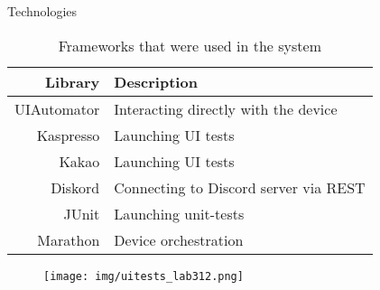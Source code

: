 \documentclass{beamer}%
\begin{document}
\begin{frame}{Technologies}
\begin{changemargin}
\footnotesize


\begin{table}[h]
\caption{Frameworks that were used in the system}
\centering\begin{tabular}{rl}
\toprule
Library     & Description                           \\
\midrule
UIAutomator & Interacting directly with the device  \\
Kaspresso   & Launching UI tests                    \\
Kakao       & Launching UI tests                    \\
Diskord     & Connecting to Discord server via REST \\
JUnit       & Launching unit-tests                  \\
Marathon    & Device orchestration                  \\
\bottomrule
\end{tabular}
\label{table:libraries}
\end{table}


\end{changemargin}
\end{frame}
\begin{frame}{}
\begin{changemargin}
\footnotesize

\begin{figure}[h]
\begin{minipage}[h]{0.9\linewidth}
\hbox{\hspace{-2em}\texttt{[image: img/uitests\_lab312.png]}}
\end{minipage}
\end{figure}

\end{changemargin}
\end{frame}
\end{document}
